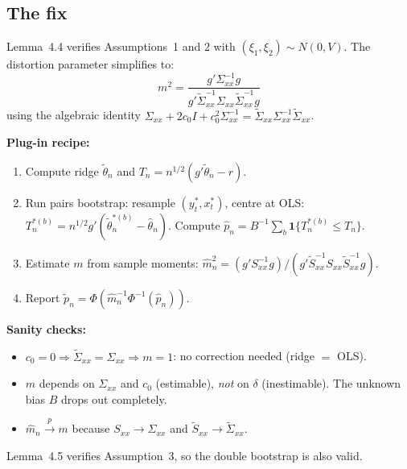 \documentclass[11pt]{article}
\theoremstyle{definition}
\begin{document}
\subsection{The fix}
 
Lemma~4.4 verifies Assumptions~1 and 2 with $(\xi_1, \xi_2) \sim N(0,V)$.
The distortion parameter simplifies to:
\[
  m^2 = \frac{g'\Sigma_{xx}^{-1}g}
             {g'\tilde\Sigma_{xx}^{-1}\Sigma_{xx}\tilde\Sigma_{xx}^{-1}g}
\]
using the algebraic identity
$\Sigma_{xx} + 2c_0 I + c_0^2\Sigma_{xx}^{-1}
= \tilde\Sigma_{xx}\Sigma_{xx}^{-1}\tilde\Sigma_{xx}$.
 
\medskip
 
\textbf{Plug-in recipe:}
\begin{enumerate}
  \item Compute ridge $\tilde\theta_n$ and
    $T_n = n^{1/2}(g'\tilde\theta_n - r)$.
  \item Run pairs bootstrap: resample $(y_t^*, x_t^*)$, centre at OLS:
    $T_n^{*(b)} = n^{1/2}g'(\tilde\theta_n^{*(b)} - \hat\theta_n)$.
    Compute $\hat p_n = B^{-1}\sum_b \mathbf{1}\{T_n^{*(b)} \le T_n\}$.
  \item Estimate $m$ from sample moments:
    $\hat m_n^2 = (g'S_{xx}^{-1}g) / (g'\tilde S_{xx}^{-1}S_{xx}\tilde S_{xx}^{-1}g)$.
  \item Report $\tilde p_n = \Phi(\hat m_n^{-1}\Phi^{-1}(\hat p_n))$.
\end{enumerate}
 
\medskip
 
\textbf{Sanity checks:}
\begin{itemize}
  \item $c_0 = 0 \Rightarrow \tilde\Sigma_{xx} = \Sigma_{xx}
    \Rightarrow m = 1$: no correction needed (ridge $=$ OLS).
  \item $m$ depends on $\Sigma_{xx}$ and $c_0$ (estimable), \textit{not}
    on $\delta$ (inestimable). The unknown bias $B$ drops out completely.
  \item $\hat m_n \xrightarrow{p} m$ because $S_{xx} \to \Sigma_{xx}$ and
    $\tilde S_{xx} \to \tilde\Sigma_{xx}$.
\end{itemize}
 
Lemma~4.5 verifies Assumption~3, so the double bootstrap is also valid.
 
\end{document}
